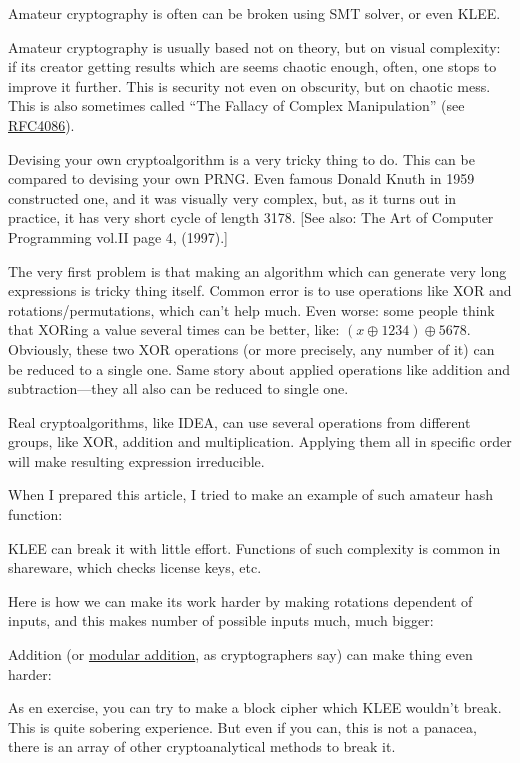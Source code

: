 Amateur cryptography is often can be broken using SMT solver, or even KLEE.

Amateur cryptography is usually based not on theory, but on visual complexity:
if its creator getting results which are seems chaotic enough, often, one stops to improve it further.
This is security not even on obscurity, but on chaotic mess.
This is also sometimes called ``The Fallacy of Complex Manipulation''
(see \href{https://tools.ietf.org/html/rfc4086}{RFC4086}).

Devising your own cryptoalgorithm is a very tricky thing to do.
This can be compared to devising your own \ac{PRNG}.
Even famous Donald Knuth in 1959 constructed one, and it was visually very complex,
but, as it turns out in practice, it has very short cycle of length 3178.
[See also: The Art of Computer Programming vol.II page 4, (1997).]

The very first problem is that making an algorithm which can generate very long expressions is tricky thing itself.
Common error is to use operations like XOR and rotations/permutations, which can't help much.
Even worse: some people think that XORing a value several times can be better, like: $(x \oplus 1234) \oplus 5678$.
Obviously, these two XOR operations (or more precisely, any number of it) can be reduced to a single one.
Same story about applied operations like addition and subtraction---they all also can be reduced to single one.

Real cryptoalgorithms, like IDEA, can use several operations from different groups, like XOR, addition and multiplication.
Applying them all in specific order will make resulting expression irreducible.

When I prepared this article, I tried to make an example of such amateur hash function:



KLEE can break it with little effort.
Functions of such complexity is common in shareware, which checks license keys, etc.

Here is how we can make its work harder by making rotations dependent of inputs,
and this makes number of possible inputs much, much bigger:



Addition (or \href{https://yurichev.com/blog/modulo/}{modular addition}, as cryptographers say) can make thing even harder:



As en exercise, you can try to make a block cipher which KLEE wouldn't break.
This is quite sobering experience.
But even if you can, this is not a panacea, there is an array of other cryptoanalytical methods to break it.


